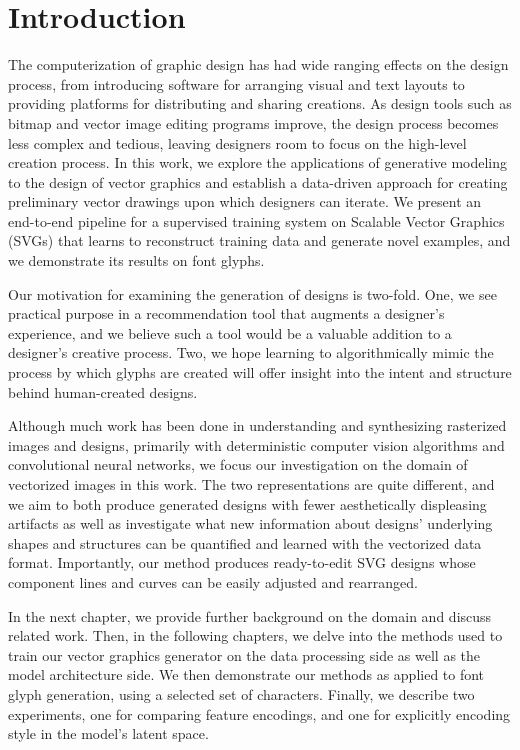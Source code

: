 \chapter{Introduction}

The computerization of graphic design has had wide ranging effects on the design process, from introducing software for arranging visual and text layouts to providing platforms for distributing and sharing creations.
As design tools such as bitmap and vector image editing programs improve, the design process becomes less complex and tedious, leaving designers room to focus on the high-level creation process.
In this work, we explore the applications of generative modeling to the design of vector graphics and establish a data-driven approach for creating preliminary vector drawings upon which designers can iterate.
We present an end-to-end pipeline for a supervised training system on Scalable Vector Graphics (SVGs) that learns to reconstruct training data and generate novel examples, and we demonstrate its results on font glyphs.

Our motivation for examining the generation of designs is two-fold.
One, we see practical purpose in a recommendation tool that augments a designer's experience, and we believe such a tool would be a valuable addition to a designer's creative process.
Two, we hope learning to algorithmically mimic the process by which glyphs are created will offer insight into the intent and structure behind human-created designs.

Although much work has been done in understanding and synthesizing rasterized images and designs, primarily with deterministic computer vision algorithms and convolutional neural networks, we focus our investigation on the domain of vectorized images in this work.
The two representations are quite different, and we aim to both produce generated designs with fewer aesthetically displeasing artifacts as well as investigate what new information about designs' underlying shapes and structures can be quantified and learned with the vectorized data format.
Importantly, our method produces ready-to-edit SVG designs whose component lines and curves can be easily adjusted and rearranged.

In the next chapter, we provide further background on the domain and discuss related work.
Then, in the following chapters, we delve into the methods used to train our vector graphics generator on the data processing side as well as the model architecture side.
We then demonstrate our methods as applied to font glyph generation, using a selected set of characters.
Finally, we describe two experiments, one for comparing feature encodings, and one for explicitly encoding style in the model's latent space.
